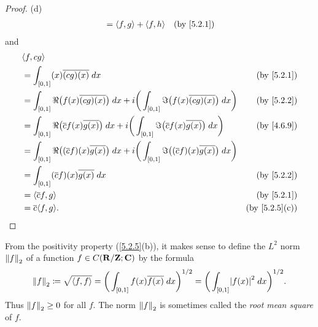 \begin{proof}{(d)}
\begin{align*}
     & = \inner*{f, g} + \inner*{f, h}                                                                                                     & \text{(by \cref{5.2.1})}
  \end{align*}
  and
  \begin{align*}
     & \inner*{f, cg}                                                                                                                                                                            \\
     & = \int_{[0, 1]} (x) \overline{(cg)(x)} \; dx                                                                                                                & \text{(by \cref{5.2.1})}    \\
     & = \int_{[0, 1]} \Re\big(f(x) \overline{(cg)(x)}\big) \; dx + i \bigg(\int_{[0, 1]} \Im\big(f(x) \overline{(cg)(x)}\big) \; dx\bigg)                         & \text{(by \cref{5.2.2})}    \\
     & = \int_{[0, 1]} \Re\big(\overline{c} f(x) \overline{g(x)}\big) \; dx + i \bigg(\int_{[0, 1]} \Im\big(\overline{c} f(x) \overline{g(x)}\big) \; dx\bigg)     & \text{(by \cref{4.6.9})}    \\
     & = \int_{[0, 1]} \Re\big((\overline{c} f)(x) \overline{g(x)}\big) \; dx + i \bigg(\int_{[0, 1]} \Im\big((\overline{c} f)(x) \overline{g(x)}\big) \; dx\bigg)                               \\
     & = \int_{[0, 1]} (\overline{c} f)(x) \overline{g(x)} \; dx                                                                                                   & \text{(by \cref{5.2.2})}    \\
     & = \inner*{\overline{c} f, g}                                                                                                                                & \text{(by \cref{5.2.1})}    \\
     & = \overline{c} \inner*{f, g}.                                                                                                                               & \text{(by \cref{5.2.5}(c))}
  \end{align*}
\end{proof}

\begin{additional corollary}\label{ac 5.2.1}
From the positivity property (\cref{5.2.5}(b)), it makes sense to define the \(L^2\) norm \(\norm*{f}_2\) of a function \(f \in C(\R / \Z ; \C)\) by the formula
\[
  \norm*{f}_2 \coloneqq \sqrt{\inner*{f, f}} = \bigg(\int_{[0, 1]} f(x) \overline{f(x)} \; dx\bigg)^{1 / 2} = \bigg(\int_{[0, 1]} \abs{f(x)}^2 \; dx\bigg)^{1 / 2}.
\]
Thus \(\norm*{f}_2 \geq 0\) for all \(f\).
The norm \(\norm*{f}_2\) is sometimes called the \emph{root mean square} of \(f\).
\end{additional corollary}


